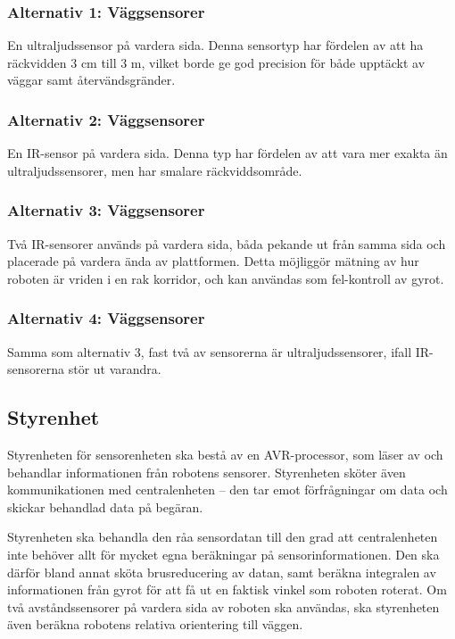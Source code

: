 \documentclass[a4paper,titlepage,12pt]{article}
\begin{document}
    \subsubsection{Alternativ 1: Väggsensorer}
    
    En ultraljudssensor på vardera sida. Denna sensortyp har fördelen av att ha
    räckvidden 3 cm till 3 m, vilket borde ge god precision för både upptäckt
    av väggar samt återvändsgränder.

    \subsubsection{Alternativ 2: Väggsensorer}

    En IR-sensor på vardera sida. Denna typ har fördelen av att vara mer exakta
    än ultraljudssensorer, men har smalare räckviddsområde.

    \subsubsection{Alternativ 3: Väggsensorer}

    Två IR-sensorer används på vardera sida, båda pekande ut från samma sida och
    placerade på vardera ända av plattformen. Detta möjliggör mätning av hur
    roboten är vriden i en rak korridor, och kan användas som fel-kontroll av
    gyrot.

    \subsubsection{Alternativ 4: Väggsensorer}

    Samma som alternativ 3, fast två av sensorerna är ultraljudssensorer, ifall
    IR-sensorerna stör ut varandra.

    \subsection{Styrenhet}

    Styrenheten för sensorenheten ska bestå av en AVR-processor, som läser av och behandlar
    informationen från robotens sensorer. Styrenheten sköter även
    kommunikationen med centralenheten -- den tar emot förfrågningar om data och
    skickar behandlad data på begäran.

    Styrenheten ska behandla den råa sensordatan till den grad att
    centralenheten inte behöver allt för mycket egna beräkningar på
    sensorinformationen. Den ska därför bland annat sköta brusreducering av
    datan, samt beräkna integralen av informationen från gyrot för att få ut en
    faktisk vinkel som roboten roterat. Om två avståndssensorer på vardera sida
    av roboten ska användas, ska styrenheten även beräkna robotens relativa
    orientering till väggen.
    
\end{document}
